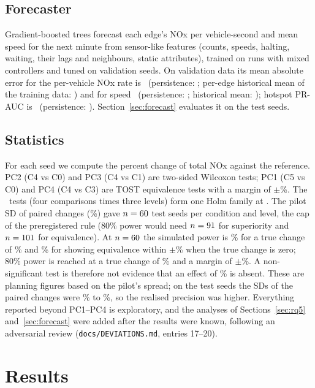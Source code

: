 \documentclass[11pt]{article}
\begin{document}
\subsection{Forecaster}
Gradient-boosted trees forecast each edge's NOx per vehicle-second and mean speed for the next minute from
sensor-like features (counts, speeds, halting, waiting, their lags and neighbours, static attributes), trained on
runs with mixed controllers and tuned on validation seeds. On validation data its mean absolute error for the
per-vehicle NOx rate is \ModelMAER\ (persistence: \PersistMAER; per-edge historical mean of the training data:
\HistMAER) and for speed \ModelMAEV\ (persistence: \PersistMAEV; historical mean: \HistMAEV); hotspot PR-AUC is
\HotspotPRAUCModel\ (persistence: \HotspotPRAUCPersistence). Section~\ref{sec:forecast} evaluates it on the test
seeds.

\subsection{Statistics}
For each seed we compute the percent change of total NOx against the reference. PC2 (C4 vs C0) and PC3 (C4 vs C1)
are two-sided Wilcoxon tests; PC1 (C5 vs C0) and PC4 (C4 vs C3) are TOST equivalence tests with a margin of
$\pm$\SESOI\%. The \TestsInFamily\ tests (four comparisons times three levels) form one Holm family at \FamilywiseAlpha. The
pilot SD of paired changes (\PilotSD\%) gave $n = 60$ test seeds per condition and level, the cap of
the preregistered rule (80\% power would need $n = 91$ for superiority and $n = 101$ for equivalence). At
$n = 60$ the simulated power is \PowerAtNSup\% for a true change of \SESOI\% and \PowerAtNEq\% for showing
equivalence within $\pm$\SESOI\% when the true change is zero; 80\% power is reached at a true change of
\DetectableEffect\% and a margin of $\pm$\DetectableMargin\%. A non-significant test is therefore not evidence that an
effect of \SESOI\% is absent. These are planning figures based on the pilot's spread; on the test seeds the SDs of
the paired changes were \ObservedSDMin\% to \ObservedSDMax\%, so the realised precision was higher. Everything
reported beyond PC1--PC4 is exploratory, and the analyses of Sections~\ref{sec:rq5} and~\ref{sec:forecast} were added
after the results were known, following an adversarial review (\texttt{docs/DEVIATIONS.md}, entries 17--20).

\section{Results}\label{sec:results}
\end{document}
